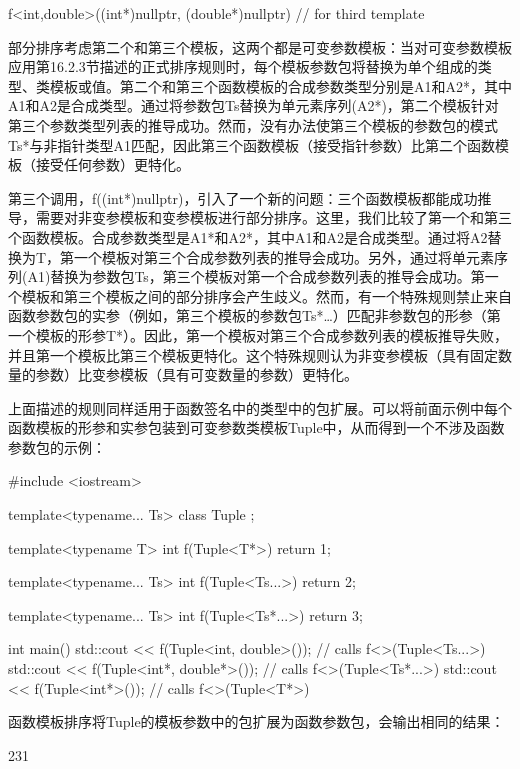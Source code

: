 \begin{cpp}
f<int,double>((int*)nullptr, (double*)nullptr) // for third template
\end{cpp}

部分排序考虑第二个和第三个模板，这两个都是可变参数模板：当对可变参数模板应用第16.2.3节描述的正式排序规则时，每个模板参数包将替换为单个组成的类型、类模板或值。第二个和第三个函数模板的合成参数类型分别是A1和A2*，其中A1和A2是合成类型。通过将参数包Ts替换为单元素序列(A2*)，第二个模板针对第三个参数类型列表的推导成功。然而，没有办法使第三个模板的参数包的模式Ts*与非指针类型A1匹配，因此第三个函数模板（接受指针参数）比第二个函数模板（接受任何参数）更特化。

第三个调用，f((int*)nullptr)，引入了一个新的问题：三个函数模板都能成功推导，需要对非变参模板和变参模板进行部分排序。这里，我们比较了第一个和第三个函数模板。合成参数类型是A1*和A2*，其中A1和A2是合成类型。通过将A2替换为T，第一个模板对第三个合成参数列表的推导会成功。另外，通过将单元素序列(A1)替换为参数包Ts，第三个模板对第一个合成参数列表的推导会成功。第一个模板和第三个模板之间的部分排序会产生歧义。然而，有一个特殊规则禁止来自函数参数包的实参（例如，第三个模板的参数包Ts*…）匹配非参数包的形参（第一个模板的形参T*）。因此，第一个模板对第三个合成参数列表的模板推导失败，并且第一个模板比第三个模板更特化。这个特殊规则认为非变参模板（具有固定数量的参数）比变参模板（具有可变数量的参数）更特化。

上面描述的规则同样适用于函数签名中的类型中的包扩展。可以将前面示例中每个函数模板的形参和实参包装到可变参数类模板Tuple中，从而得到一个不涉及函数参数包的示例：

\begin{cpp}
#include <iostream>

template<typename... Ts> class Tuple
{
};

template<typename T>
int f(Tuple<T*>)
{
	return 1;
}

template<typename... Ts>
int f(Tuple<Ts...>)
{
	return 2;
}

template<typename... Ts>
int f(Tuple<Ts*...>)
{
	return 3;
}

int main()
{
	std::cout << f(Tuple<int, double>()); // calls f<>(Tuple<Ts...>)
	std::cout << f(Tuple<int*, double*>()); // calls f<>(Tuple<Ts*...>)
	std::cout << f(Tuple<int*>()); // calls f<>(Tuple<T*>)
}
\end{cpp}

函数模板排序将Tuple的模板参数中的包扩展为函数参数包，会输出相同的结果：

\begin{shell}
231
\end{shell}





















